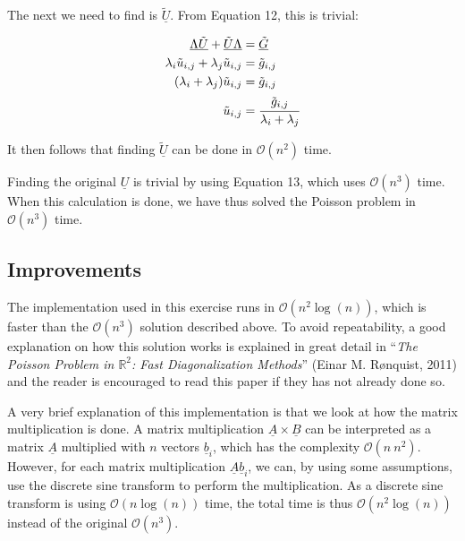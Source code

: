 The next we need to find is $\underline{\tilde{U}}$. From Equation 12, this is
trivial:

\begin{align*}
  \underline {\Lambda \tilde{U}} + \underline {\tilde{U} \Lambda} &=
  \underline{\tilde{G}}\\
  \lambda_i\tilde{u}_{i,j} + \lambda_j\tilde{u}_{i,j} &= \tilde{g}_{i,j} \\
  (\lambda_i + \lambda_j)\tilde{u}_{i,j} &= \tilde{g}_{i,j} \\
  \tilde{u}_{i,j} &= \cfrac{\tilde{g}_{i,j}}{\lambda_i + \lambda_j}
\end{align*}

It then follows that finding $\underline{\tilde{U}}$ can be done in
$\mathcal{O}(n^2)$ time.

Finding the original $\underline U$ is trivial by using Equation 13, which uses
$\mathcal{O}(n^3)$ time. When this calculation is done, we have thus solved the
Poisson problem in $\mathcal{O}(n^3)$ time.

\subsection{Improvements}

The implementation used in this exercise runs in $\mathcal{O}(n^2\log (n))$,
which is faster than the $\mathcal{O}(n^3)$ solution described above. To avoid
repeatability, a good explanation on how this solution works is explained in
great detail in ``{\em The Poisson Problem in $\mathbb{R}^2$: Fast
  Diagonalization Methods}'' (Einar M. Rønquist, 2011) and the reader is
encouraged to read this paper if they has not already done so.

A very brief explanation of this implementation is that we look at how the
matrix multiplication is done. A matrix multiplication $\underline A \times
\underline B$ can be interpreted as a matrix $\underline A$ multiplied with $n$
vectors $\underline b_i$, which has the complexity $\mathcal{O}(n~n^2)$.
However, for each matrix multiplication $\underline A \underline b_i$, we can,
by using some assumptions, use the discrete sine transform to perform the
multiplication. As a discrete sine transform is using $\mathcal{O}(n \log (n))$
time, the total time is thus $\mathcal{O}(n^2\log (n))$ instead of the original
$\mathcal{O}(n^3)$.

